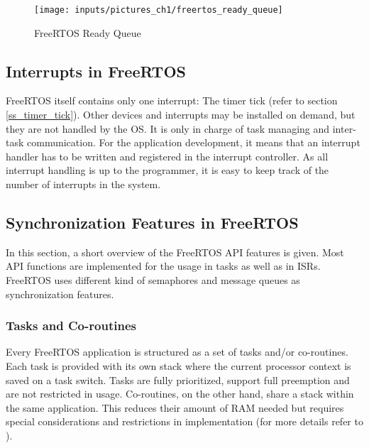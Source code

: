 \begin{figure}[htb]
	\begin{center}
		\texttt{[image: inputs/pictures\_ch1/freertos\_ready\_queue]}
	\end{center}
	\caption[FreeRTOS Ready Queue]{FreeRTOS Ready Queue \cite{dev:taoosa}} \label{fig_freertos_ready_queue}
\end{figure}

\subsection{Interrupts in FreeRTOS}\label{ss_interrupts_in_freertos}
FreeRTOS itself contains only one interrupt: The timer tick (refer to section \ref{ss_timer_tick}).
Other devices and interrupts may be installed on demand, but they are not handled by the OS. 
It is only in charge of task managing and inter-task communication.
For the application development, it means that an interrupt handler has to be written and registered in the interrupt controller.
As all interrupt handling is up to the programmer, it is easy to keep track of the number of interrupts in the system.

\subsection{Synchronization Features in FreeRTOS}
In this section, a short overview of the FreeRTOS \ac{API} features is given.
Most \ac{API} functions are implemented for the usage in tasks as well as in \acp{ISR}.
FreeRTOS uses different kind of semaphores and message queues as synchronization features.

\subsubsection{Tasks and Co-routines}
Every FreeRTOS application is structured as a set of tasks and/or co-routines.
Each task is provided with its own stack where the current processor context is saved on a task switch.
Tasks are fully prioritized, support full preemption and are not restricted in usage.
Co-routines, on the other hand, share a stack within the same application. 
This reduces their amount of \ac{RAM} needed but requires special considerations and restrictions in implementation (for more details refer to \cite{freertos_coroutines_tasks}).

